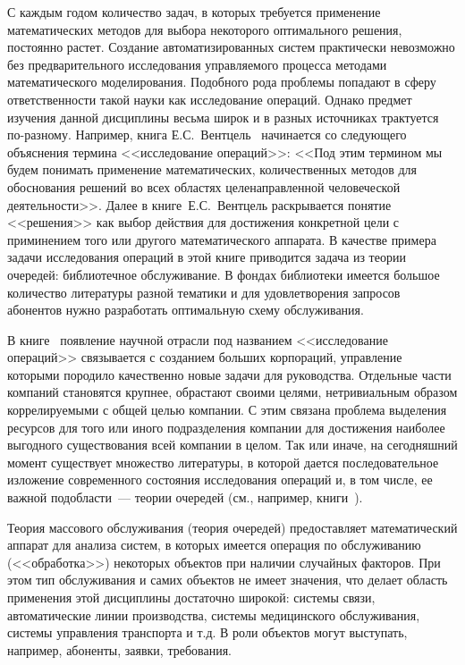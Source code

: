 С каждым годом количество задач, в которых требуется применение математических методов для выбора некоторого оптимального решения, постоянно растет. Создание автоматизированных систем практически невозможно без предварительного исследования управляемого процесса методами математического моделирования. Подобного рода проблемы попадают в сферу ответственности такой науки как исследование операций. Однако предмет изучения данной дисциплины весьма широк и в разных источниках трактуется по-разному. Например, книга Е.С.~Вентцель~\cite{Ventcel} начинается со следующего объяснения термина <<исследование операций>>: <<Под этим термином мы будем понимать применение математических, количественных методов для обоснования решений во всех областях целенаправленной человеческой деятельности>>. Далее в книге~Е.С.~Вентцель раскрывается понятие <<решения>> как выбор действия для достижения конкретной цели с приминением того или другого математического аппарата. В качестве примера задачи исследования операций в этой книге приводится задача из теории очередей: библиотечное обслуживание. В фондах библиотеки имеется большое количество литературы разной тематики и для удовлетворения запросов абонентов нужно разработать оптимальную схему обслуживания.

В книге~\cite{Hillier} появление научной отрасли под названием  <<исследование операций>>  связывается с созданием больших корпораций, управление которыми породило качественно новые задачи для руководства. Отдельные части компаний становятся крупнее, обрастают своими целями, нетривиальным образом коррелируемыми с общей целью компании. С этим связана проблема выделения ресурсов для того или иного подразделения компании для достижения наиболее выгодного существования всей компании в целом. Так или иначе, на сегодняшний момент существует множество литературы, в которой дается последовательное изложение современного состояния исследования операций и, в том числе, ее важной подобласти~--- теории очередей (см., например, книги~\cite{Taha, Carter, Murthy, Hillier, Encylc, Ventcel, Eltarenko}).

Теория массового обслуживания (теория очередей) предоставляет математический аппарат для анализа систем, в которых имеется операция по обслуживанию (<<обработка>>) некоторых объектов при наличии случайных факторов. При этом тип обслуживания и самих объектов не имеет значения, что делает область применения этой дисциплины достаточно широкой: системы связи, автоматические линии производства, системы медицинского обслуживания, системы управления транспорта и т.д.  В роли объектов могут выступать, например, абоненты, заявки, требования.

